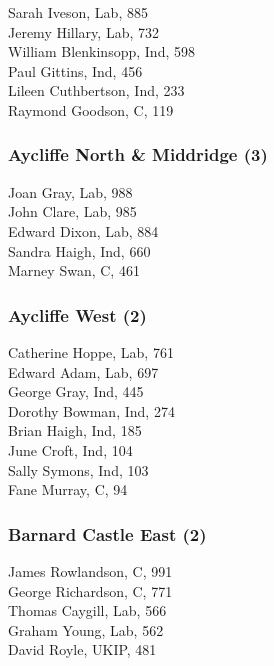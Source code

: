 \documentclass[a4paper,openany,10pt]{book}
\begin{document}


Sarah Iveson, Lab, 885\\
Jeremy Hillary, Lab, 732\\
William Blenkinsopp, Ind, 598\\
Paul Gittins, Ind, 456\\
Lileen Cuthbertson, Ind, 233\\
Raymond Goodson, C, 119\\


\subsubsection*{Aycliffe North \& Middridge (3)}



Joan Gray, Lab, 988\\
John Clare, Lab, 985\\
Edward Dixon, Lab, 884\\
Sandra Haigh, Ind, 660\\
Marney Swan, C, 461\\


\subsubsection*{Aycliffe West (2)}



Catherine Hoppe, Lab, 761\\
Edward Adam, Lab, 697\\
George Gray, Ind, 445\\
Dorothy Bowman, Ind, 274\\
Brian Haigh, Ind, 185\\
June Croft, Ind, 104\\
Sally Symons, Ind, 103\\
Fane Murray, C, 94\\


\subsubsection*{Barnard Castle East (2)}



James Rowlandson, C, 991\\
George Richardson, C, 771\\
Thomas Caygill, Lab, 566\\
Graham Young, Lab, 562\\
David Royle, UKIP, 481\\
\end{document}

